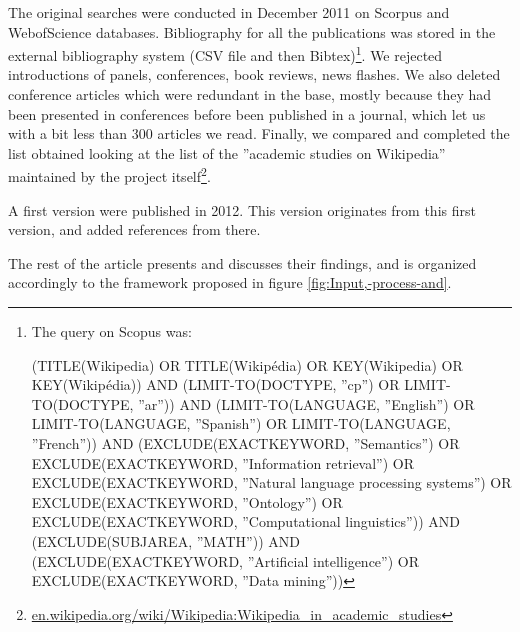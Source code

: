 The original searches were conducted in December 2011 on Scorpus and WebofScience
databases. Bibliography for all the publications was stored in the
external bibliography system (CSV file and then Bibtex)\footnote{The query on Scopus was:

(TITLE(Wikipedia) OR TITLE(Wikip{\'{e}}dia) OR KEY(Wikipedia) OR KEY(Wikipédia))
AND (LIMIT-TO(DOCTYPE, ''cp'') OR LIMIT-TO(DOCTYPE,
''ar'')) AND (LIMIT-TO(LANGUAGE, ''English'')
OR LIMIT-TO(LANGUAGE, ''Spanish'') OR LIMIT-TO(LANGUAGE,
''French'')) AND (EXCLUDE(EXACTKEYWORD,
''Semantics'') OR EXCLUDE(EXACTKEYWORD,
''Information retrieval'') OR EXCLUDE(EXACTKEYWORD,
''Natural language processing systems'')
OR EXCLUDE(EXACTKEYWORD, ''Ontology'') OR
EXCLUDE(EXACTKEYWORD, ''Computational linguistics''))
AND (EXCLUDE(SUBJAREA, ''MATH'')) AND (EXCLUDE(EXACTKEYWORD,
''Artificial intelligence'') OR EXCLUDE(EXACTKEYWORD,
''Data mining''))}. We rejected introductions of panels, conferences, book reviews,
news flashes. We also deleted conference articles which were redundant
in the base, mostly because they had been presented in conferences
before been published in a journal, which let us with a bit less than
300 articles we read. Finally, we compared and completed the list
obtained looking at the list of the ''academic studies on Wikipedia''
maintained by the project itself\footnote{\url{en.wikipedia.org/wiki/Wikipedia:Wikipedia_in_academic_studies}}.

A first version were published in 2012. This version originates from this first version, and added references from there.

The rest of the article presents and discusses their findings, and
is organized accordingly to the framework proposed in figure \ref{fig:Input,-process-and}.